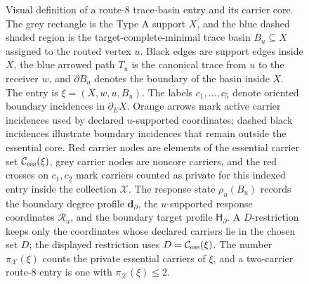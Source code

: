 \documentclass[11pt]{article}
\newcommand{\profile}{\mathsf H}
\begin{document}
\begin{figure}[t]
{%
}
\caption[Visual definition of a route-8 trace-basin entry]{Visual definition of a route-8 trace-basin entry and its carrier core.  The grey rectangle is the Type A support $X$, and the blue dashed shaded region is the target-complete-minimal trace basin $B_u\subseteq X$ assigned to the routed vertex $u$.  Black edges are support edges inside \(X\), the blue arrowed path $T_u$ is the canonical trace from $u$ to the receiver $w$, and $\partial B_u$ denotes the boundary of the basin inside $X$.  The entry is $\xi=(X,w,u,B_u)$.  The labels $c_1,\ldots,c_5$ denote oriented boundary incidences in $\partial_E X$.  Orange arrows mark active carrier incidences used by declared $u$-supported coordinates; dashed black incidences illustrate boundary incidences that remain outside the essential core.  Red carrier nodes are elements of the essential carrier set $\mathcal C_{\rm ess}(\xi)$, grey carrier nodes are noncore carriers, and the red crosses on $c_1,c_2$ mark carriers counted as private for this indexed entry inside the collection $\mathcal X$.  The response state $\rho_u(B_u)$ records the boundary degree profile $\mathbf d_\partial$, the $u$-supported response coordinates $\mathcal R_u$, and the boundary target profile $\profile_\partial$.  A $D$-restriction keeps only the coordinates whose declared carriers lie in the chosen set $D$; the displayed restriction uses $D=\mathcal C_{\rm ess}(\xi)$.  The number $\pi_{\mathcal X}(\xi)$ counts the private essential carriers of $\xi$, and a two-carrier route-8 entry is one with $\pi_{\mathcal X}(\xi)\le2$.}
\label{fig:typeA-route8-carrier-gadget}
\end{figure}
\end{document}
